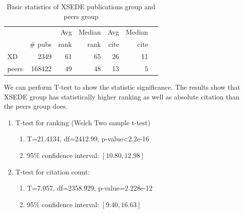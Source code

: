 \documentclass{sig-alternate}
\begin{document}
\begin{table}[h]
\caption{Basic statistics of XSEDE publications group and peers group}
\label{T:groups_stats}
\centering
\begin{small}
\begin{tabular}{p{}rrrrrr}
 &  & Avg & Median & Avg & Median \\
 & \# pubs & rank & rank & cite & cite \\
\hline
XD & 2349	& 61	& 65	& 26	& 11 \\
peers & 168422	& 49	& 48	& 13	& 5 \\
\end{tabular}
\end{small}
\end{table}

We can perform T-test to show the statistic significance. The results
show that XSEDE group has statistically higher ranking as well as
absolute citation than the peers group does.

\begin{enumerate}
\item T-test for ranking (Welch Two sample t-test)
\begin{enumerate}
\item T=21.4134, df=2412.99, p-value<2.2e-16
\item 95\% confidence interval: $[10.80, 12.98]$
\end{enumerate}
\item T-test for citation count:
\begin{enumerate}
\item T=7.057, df=2358.929, p-value=2.228e-12
\item 95\% confidence interval: $[9.40, 16.63]$
\end{enumerate}
\end{enumerate}
 
\end{document}
